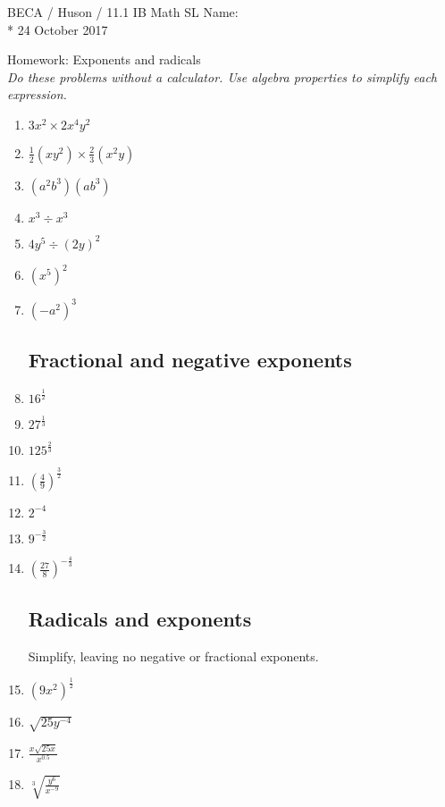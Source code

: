 \documentclass[]{book}
\begin{document}
\noindent BECA / Huson / 11.1 IB Math SL \hspace{2in} Name:\\*
24 October 2017
\begin{center}
{\Large Homework: Exponents and radicals}\\
\textit{Do these problems without a calculator. Use algebra properties to simplify each expression.}
\end{center}


\begin{enumerate}

\subsection*{Exponent rules}

\item $3x^2 \times 2x^4y^2$
\item $\displaystyle \frac{1}{2} (xy^2) \times \frac{2}{3}(x^2y)$
\item $(a^2b^3)(ab^3)$
\item $x^3 \div x^3$
\item $4y^5 \div (2y)^2$
\item $(x^5)^2$
\item $(-a^2)^3$

\subsection*{Fractional and negative exponents}

\item $\displaystyle  16^\frac{1}{2}$
\item $\displaystyle  27^\frac{1}{3}$
\item $\displaystyle  125^\frac{2}{3}$
\item $\displaystyle  (\frac{4}{9})^\frac{3}{2}$
\item $2^{-4}$
\item $9^{-\frac{3}{2}}$
\item $(\frac{27}{8})^{-\frac{4}{3}}$

\subsection*{Radicals and exponents}
Simplify, leaving no negative or fractional exponents.

\item $(9x^2)^\frac{1}{2}$
\item $\sqrt{25y^{-4}}$
\item $\displaystyle  \frac{x \sqrt{25x}}{x^{0.5}}$
\item $\displaystyle  \sqrt[3]{\frac{y^6}{x^{-9}}}$





\end{enumerate}
\end{document}
